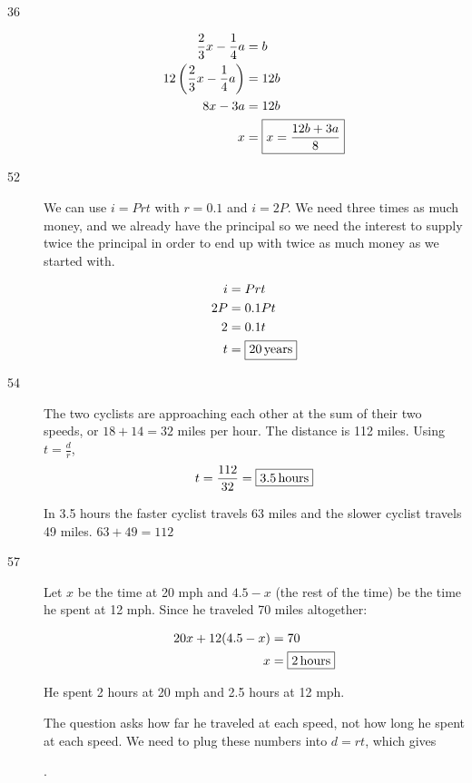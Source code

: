 \documentclass[letterpaper, landscape]{exam}
\begin{document}
\begin{description}
      \item[36]
        \begin{align*}
          \frac{2}{3}x - \frac{1}{4}a            & = b \\
          12 \del{ \frac{2}{3}x - \frac{1}{4}a } & = 12 b \\
          8x - 3a                                & = 12b \\
          x                                      & = \boxed{ x = \frac{12b + 3a}{8} } \\
        \end{align*}

      \newpage{}

      \item[52] 
        We can use $i = Prt$ with $r = 0.1$ and $i = 2P$.  We need three times as much money, and we
        already have the principal so we need the interest to supply twice the principal in order to
        end up with twice as much money as we started with.

        \begin{align*}
          i  & = Prt \\
          2P & = 0.1 P t \\
          2  & = 0.1  t \\
          t  & = \boxed{ \unit[20]{years} } \\
        \end{align*}

      \item[54] 
        The two cyclists are approaching each other at the sum of their two speeds, or 
        $18 + 14 = 32$ miles per hour.  The distance is 112 miles.  Using $t = \frac{d}{r}$, 
        \[
          t = \frac{112}{32} = \boxed{ \unit[3.5]{hours} }
        \]

        In 3.5 hours the faster cyclist travels 63 miles and the slower cyclist travels 49 miles.  
        $63 + 49 = 112$

      \newpage

      \item[57] Let $x$ be the time at 20 mph and $4.5 - x$ (the rest of the time) be the time he
        spent at 12 mph.  Since he traveled 70 miles altogether:

        \begin{align*}
          20x + 12(4.5 - x) & = 70 \\
          x                 & = \boxed{ \unit[2]{hours} } \\
        \end{align*}

      He spent 2 hours at 20 mph and 2.5 hours at 12 mph.  

      The question asks how far he traveled at each speed, not how long he spent at each speed.  We
      need to plug these numbers into $d = rt$, which gives 
      
      .  

  \end{description}
  \fi
\end{document}
